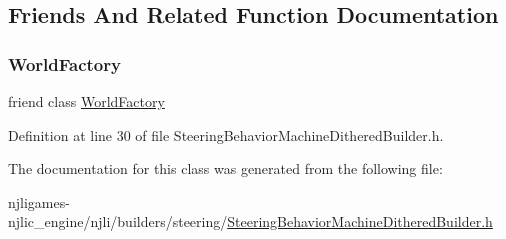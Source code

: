 \subsection{Friends And Related Function Documentation}
\mbox{\label{classnjli_1_1_steering_behavior_machine_dithered_builder_acb96ebb09abe8f2a37a915a842babfac}} 
\subsubsection{\texorpdfstring{World\+Factory}{WorldFactory}}
{\footnotesize\ttfamily friend class \mbox{\hyperlink{classnjli_1_1_world_factory}{World\+Factory}}\hspace{0.3cm}{\ttfamily [friend]}}



Definition at line 30 of file Steering\+Behavior\+Machine\+Dithered\+Builder.\+h.



The documentation for this class was generated from the following file\+:\begin{DoxyCompactItemize}
\item 
njligames-\/njlic\+\_\+engine/njli/builders/steering/\mbox{\hyperlink{_steering_behavior_machine_dithered_builder_8h}{Steering\+Behavior\+Machine\+Dithered\+Builder.\+h}}\end{DoxyCompactItemize}
